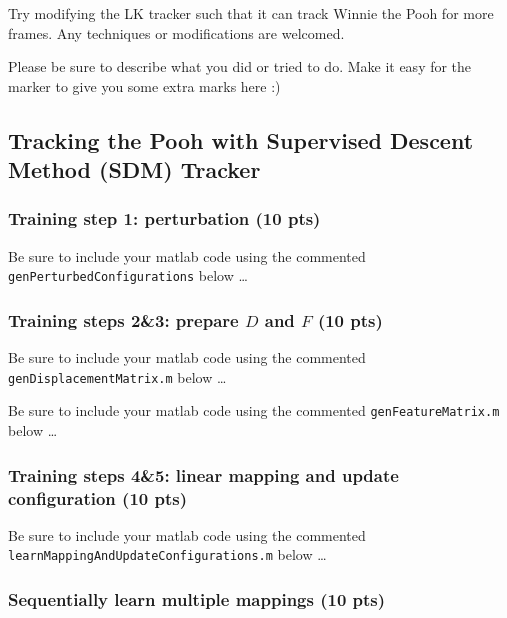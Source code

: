 \documentclass[12pt]{article}
\newcounter{list}
\begin{document}
Try modifying the LK tracker such that it can track Winnie the Pooh for more frames. Any techniques or modifications are
welcomed.

Please be sure to describe what you did or tried to do. Make it easy for the marker to give you some extra marks here :)

\subsection{Tracking the Pooh with Supervised Descent Method (SDM) Tracker}

\subsubsection{Training step 1: perturbation (10 pts)\\}

Be sure to include your matlab code using the commented \verb+genPerturbedConfigurations+  below \ldots



\subsubsection{Training steps 2\&3: prepare $D$ and $F$ (10 pts)\\}

Be sure to include your matlab code using the commented \verb+genDisplacementMatrix.m+  below \ldots


Be sure to include your matlab code using the commented \verb+genFeatureMatrix.m+  below \ldots



\subsubsection{Training steps 4\&5: linear mapping and update configuration (10 pts)\\}

Be sure to include your matlab code using the commented \verb+learnMappingAndUpdateConfigurations.m+  below \ldots



\subsubsection{Sequentially learn multiple mappings (10 pts)\\}
\end{document}

